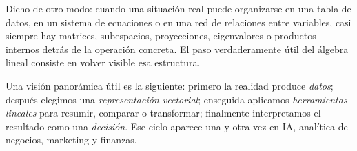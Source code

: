 \documentclass[10pt,a4paper,oneside]{article}
\theoremstyle{plain}
\theoremstyle{definition}
\theoremstyle{remark}
\begin{document}
\medskip

Dicho de otro modo: cuando una situación real puede organizarse en una tabla de datos, en un sistema de ecuaciones o en una red de relaciones entre variables, casi siempre hay matrices, subespacios, proyecciones, eigenvalores o productos internos detrás de la operación concreta. El paso verdaderamente útil del álgebra lineal consiste en volver visible esa estructura.

\begin{intuitionBox}
Una visión panorámica útil es la siguiente: primero la realidad produce \emph{datos}; después elegimos una \emph{representación vectorial}; enseguida aplicamos \emph{herramientas lineales} para resumir, comparar o transformar; finalmente interpretamos el resultado como una \emph{decisión}. Ese ciclo aparece una y otra vez en IA, analítica de negocios, marketing y finanzas.
\end{intuitionBox}

\vspace{1.15em}
\end{document}
